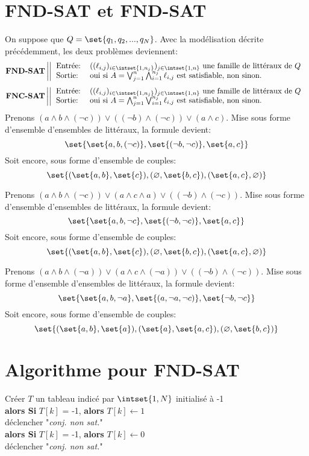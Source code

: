 \documentclass{scrartcl}
\newcommand{\pb}[3]
{
	\textbf{#1}
	\left|\left|\begin{tabular}{l l}
		Entrée: & #2 \\
		Sortie: & #3
	\end{tabular}\right.\right.
}
\begin{document}
	\section{\textbf{FND-SAT} et \textbf{FND-SAT}}
		On suppose que $Q = \set{q_1,q_2,...,q_N}$. Avec la modélisation décrite précédemment, les deux problèmes deviennent:
		\[
			\pb{FND-SAT}{$((\ell_{i,j})_{i\in\intset{1,n_j}})_{j\in\intset{1,n}}$ une famille de littéraux de $Q$}{oui si $A = \bigvee_{j=1}^n\bigwedge_{i=1}^{n_j}\ell_{i,j}$ est satisfiable, non sinon.}
		\]
		\[
			\pb{FNC-SAT}{$((\ell_{i,j})_{i\in\intset{1,n_j}})_{j\in\intset{1,n}}$ une famille de littéraux de $Q$}{oui si $A = \bigwedge_{j=1}^n\bigvee_{i=1}^{n_j}\ell_{i,j}$ est satisfiable, non sinon.}
		\]
		\exemple Prenons $(a\wedge b \wedge (\neg c)) \vee ((\neg b) \wedge (\neg c)) \vee (a \wedge c)$.
		Mise sous forme d'ensemble d'ensembles de littéraux, la formule devient:
		\[ \set{\set{a,b,(\neg c)},\set{(\neg b,\neg c)},\set{a,c}} \]
		Soit encore, sous forme d'ensemble de couples:
		\[ \set{(\set{a,b},\set{c}),(\varnothing, \set{b,c}), (\set{a,c},\varnothing)} \]

		\exemple Prenons $(a\wedge b \wedge (\neg c)) \vee (a \wedge c \wedge a) \vee ((\neg b) \wedge (\neg c))$.
		Mise sous forme d'ensemble d'ensembles de littéraux, la formule devient:
		\[ \set{\set{a,b,\neg c},\set{(\neg b,\neg c)},\set{a,c}} \]
		Soit encore, sous forme d'ensemble de couples:
		\[ \set{(\set{a,b},\set{c}),(\varnothing, \set{b,c}), (\set{a,c},\varnothing)} \]

		\exemple Prenons $(a\wedge b \wedge (\neg a)) \vee (a \wedge c \wedge (\neg a)) \vee ((\neg b) \wedge (\neg c))$.
		Mise sous forme d'ensemble d'ensembles de littéraux, la formule devient:
		\[ \set{\set{a,b,\neg a},\set{(a, \neg a,\neg c)},\set{\neg b, \neg c}} \]
		Soit encore, sous forme d'ensemble de couples:
		\[ \set{(\set{a,b},\set{a}),(\set{a}, \set{a,c}), (\varnothing,\set{b,c})} \]

	\section{Algorithme pour FND-SAT}
		{\parindent0pt }
		\tab	Créer $T$ un tableau indicé par $\intset{1,N}$ initialisé à -1 \\
		\tab	\algotry 
		\tab	\tab	{}
		\tab	\tab	\tab	{}
		\tab	\tab	\tab	\tab	\textbf{alors Si} $T[k]$ = -1, \textbf{alors} $T[k] \leftarrow 1$ \\
		\tab	\tab	\tab	{} déclencher "\textit{conj. non sat.}" \\
		\tab	\tab	\tab	{}
		\tab	\tab	\tab	\tab	\textbf{alors Si} $T[k]$ = -1, \textbf{alors} $T[k] \leftarrow 0$ \\
		\tab	\tab	\tab	{} déclencher "\textit{conj. non sat.}" \\
		\tab	\tab	\algoreturn{\algotrue}
		\tab	{}
		\algoreturn{\algofalse}
\end{document}
